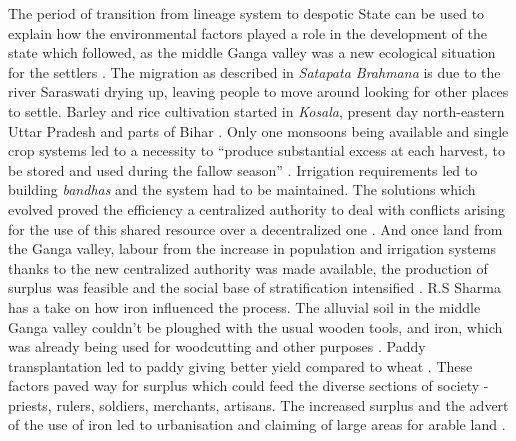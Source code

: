 \documentclass[a4paper]{article}
\begin{document}
The period of transition from lineage system to despotic State can be
used to explain how the environmental factors played a role in the
development of the state which followed, as the middle Ganga valley was
a new ecological situation for the settlers \cite[p.
72]{thapar1984lineage}. The migration as described in \textit{Satapata
Brahmana} is due to the river Saraswati drying up, leaving people to
move around looking for other places to settle. Barley and rice
cultivation started in \textit{Kosala}, present day north-eastern Uttar
Pradesh and parts of Bihar \cite[p. 73-74]{thapar1984lineage}. Only one
monsoons being available and single crop systems led to a necessity to
``produce substantial excess at each harvest, to be stored and used
during the fallow season'' \cite[p.74]{thapar1984lineage}. Irrigation
requirements led to building \textit{bandhas} and the system had to be
maintained.  The solutions which evolved proved the efficiency a
centralized authority to deal with conflicts arising for the use of this
shared resource over a decentralized one \cite[p.
75]{thapar1984lineage}. And once land from the Ganga valley, labour from
the increase in population and irrigation systems thanks to the new
centralized authority was made available, the production of surplus was
feasible and the social base of stratification intensified \cite[p.
76]{thapar1984lineage}. R.S Sharma has a take on how iron influenced the
process. The alluvial soil in the middle Ganga valley couldn't be
ploughed with the usual wooden tools, and iron, which was already being
used for woodcutting and other purposes \cite[p. 68]{sharma1996State}.
Paddy transplantation led to paddy giving better yield compared to wheat
\cite[p 68-69]{sharma1996State}. These factors paved way for surplus
which could feed the diverse sections of society - priests, rulers,
soldiers, merchants, artisans\cite[p.  69]{sharma1996State}. The
increased surplus and the advert of the use of iron led to urbanisation
and claiming of large areas for arable land
\cite[p.98]{sharma1996State}. 
\end{document}
